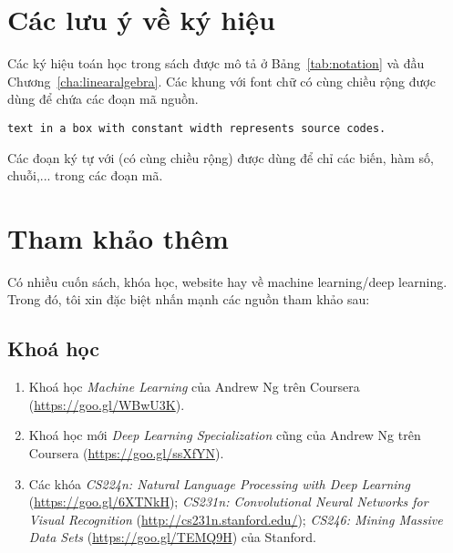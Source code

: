 \section{Các lưu ý về ký hiệu}
Các ký hiệu toán học trong sách được mô tả ở Bảng~\ref{tab:notation} và đầu
Chương~\ref{cha:linearalgebra}.
Các khung với font chữ có cùng chiều rộng được dùng để chứa các đoạn mã nguồn.
\begin{lstlisting}
text in a box with constant width represents source codes.
\end{lstlisting}
Các đoạn ký tự với  (có cùng chiều rộng)
được dùng để chỉ các biến, hàm số, chuỗi,...  trong các đoạn mã.


\section{Tham khảo thêm}

Có nhiều cuốn sách, khóa học, website hay về machine learning/deep learning. Trong đó, tôi xin đặc biệt nhấn mạnh các nguồn tham khảo sau:

\subsection{Khoá học}
\begin{enumerate}
\item Khoá học \textit{Machine Learning} của Andrew Ng trên Coursera
(\url{https://goo.gl/WBwU3K}).

\item Khoá học mới \textit{Deep Learning Specialization} cũng của Andrew Ng
trên Coursera (\url{https://goo.gl/ssXfYN}).

\item Các khóa \textit{CS224n: Natural Language Processing with Deep
Learning} (\url{https://goo.gl/6XTNkH}); \textit{CS231n: Convolutional Neural
Networks for Visual Recognition} (\url{http://cs231n.stanford.edu/});
\textit{CS246: Mining Massive Data Sets} (\url{https://goo.gl/TEMQ9H}) của
Stanford.


\end{enumerate}

